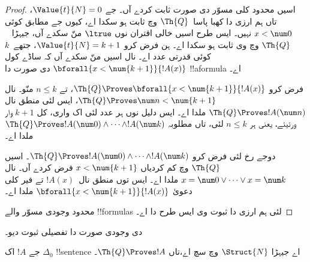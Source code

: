 \documentclass[../../../include/open-logic-section]{subfiles}
\begin{document}
\begin{proof}
    اسیں محدود کلی مسوّر دی صورت ثابت کردے آں۔
    جے $\Value{t}{N} = 0$، تاں ہم ارزی دا کھبا پاسا~$\Th{Q}$
    وچ ثابت ہو سکدا اے، کیوں جے 
    مطابق کوئی $x<\num 0$ نہیں۔
    ایس طرح اسیں خالی اقتران نوں $\ltrue$ منّ سکدے آں، جیہڑا
    ~$\Th{Q}$ وچ وی ثابت ہو سکدا اے۔
    ہن فرض کرو $\Value{t}{N} = k+1$، جتھے~$k$ کوئی قدرتی عدد اے۔
     نال اسیں منّ سکدے آں کہ
    ساڈے کول $\bforall{x<\num{k+1}}{!A(x)}$ دی صورت دا !!a{formula} اے۔
    
    فرض کرو $\Th{Q} \Proves \bforall{x<\num{k+1}}{!A(x)}$،
    تے $n \leq k$ منّو۔  نال
    $\Th{Q} \Proves \num n < \num{k+1}$، ایس لئی منطق نال
    $\Th{Q} \Proves !A(\num n)$ ملدا اے۔ ایس دلیل نوں ہر عدد
    لئی اک واری، کل $k+1$ وار ورتیئے، یعنی ہر $n \leq k$ لئی،
    تاں مطلوبہ $\Th{Q} \Proves !A(\num 0)
    \land \dots \land !A(\num k)$ ملدا اے۔
    
    دوجے رخ لئی فرض کرو $\Th{Q} \Proves
    !A(\num 0) \land \dots \land !A(\num k)$۔ اسیں
    $\Th{Q}$ وچ کم کردیاں $x < \num{k+1}$ فرض کردے آں۔
     نال
    $x = \num 0 \lor \dots \lor x = \num k$ ملدا اے۔ ایس توں
    منطق نال~$!A(x)$ تے فیر کلی دعویٰ
    $\bforall{x<\num{k+1}}{!A(x)}$ ملدا اے۔
    
    محدود وجودی مسوّر والے !!{formula}s لئی ہم ارزی دا ثبوت
    وی ایس طرح دا اے۔
\end{proof}

\begin{prob}
 دی وجودی صورت دا تفصیلی ثبوت دیو۔
\end{prob}

\begin{lem}
جے $!A$ اک $\Delta_0$ !!{sentence} اے جیہڑا
$\Struct{N}$ وچ سچ اے،تاں $\Th{Q} \Proves !A$۔
\end{lem}
\end{document}
